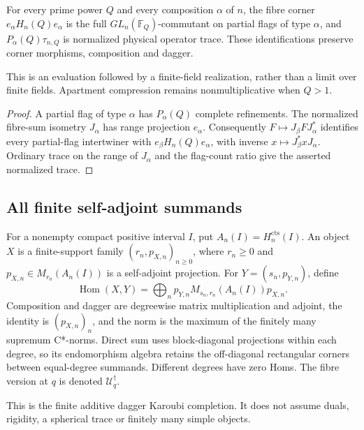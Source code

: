 \begin{proposition}
{\normalfont\statusProved}\quad
For every prime power $Q$ and every composition $\alpha$ of $n$, the fibre
corner $e_\alpha H_n(Q)e_\alpha$ is the full $GL_n(\mathbb F_Q)$-commutant
on partial flags of type $\alpha$, and $P_\alpha(Q)\tau_{n,Q}$ is normalized
physical operator trace.  These identifications preserve corner morphisms,
composition and dagger.
\end{proposition}
\begin{scope}
This is an evaluation followed by a finite-field realization, rather than a
limit over finite fields.  Apartment compression remains nonmultiplicative
when $Q>1$.
\end{scope}
\begin{proof}
A partial flag of type $\alpha$ has $P_\alpha(Q)$ complete refinements.  The
normalized fibre-sum isometry $J_\alpha$ has range projection $e_\alpha$.
Consequently $F\mapsto J_\beta FJ_\alpha^*$ identifies every partial-flag
intertwiner with $e_\beta H_n(Q)e_\alpha$, with inverse
$x\mapsto J_\beta^*xJ_\alpha$.  Ordinary trace on the range of $J_\alpha$
and the flag-count ratio give the asserted normalized trace.
\end{proof}

\subsection{All finite self-adjoint summands}

\begin{definition}
For a nonempty compact positive interval $I$, put
$A_n(I)=H_n^{\mathrm{cts}}(I)$.  An object $X$ is a finite-support family
$(r_n,p_{X,n})_{n\geq0}$, where $r_n\geq0$ and
$p_{X,n}\in M_{r_n}(A_n(I))$ is a self-adjoint projection.  For
$Y=(s_n,p_{Y,n})$, define
\[
 \operatorname{Hom}(X,Y)=
 \bigoplus_n p_{Y,n}M_{s_n,r_n}(A_n(I))p_{X,n}.
\]
Composition and dagger are degreewise matrix multiplication and adjoint,
the identity is $(p_{X,n})_n$, and the norm is the maximum of the finitely
many supremum C*-norms.  Direct sum uses block-diagonal projections within
each degree, so its endomorphism algebra retains the off-diagonal rectangular
corners between equal-degree summands.  Different degrees have zero Homs.
The fibre version at $q$ is denoted $\mathcal U_q^\dagger$.
\end{definition}
\begin{scope}
This is the finite additive dagger Karoubi completion.  It does not assume
duals, rigidity, a spherical trace or finitely many simple objects.
\end{scope}

